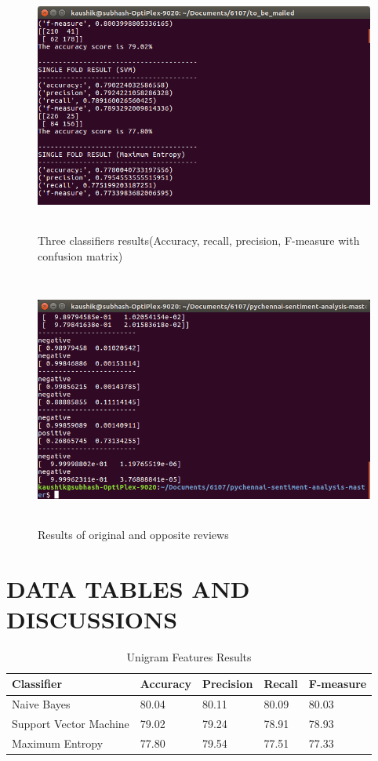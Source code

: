 \documentclass[oneside,a4paper,12pt]{pictreport}
\begin{document}
\begin{figure}[!h]
\includegraphics[width=5.5in,height=3.3in]{screenshot5.png}
\caption{Three classifiers results(Accuracy, recall, precision, F-measure with confusion matrix)}
\end{figure}


\begin{figure}[!h]
\includegraphics[width=5.5in,height=3.3in]{screenshot_1.png}
\caption{Results of original and opposite reviews}
\end{figure}


\chapter{DATA TABLES AND DISCUSSIONS} 


\begin{table}[h!]
\centering
\caption{Unigram Features Results}
\label{my-label}
\begin{tabular}{|l|l|l|l|l|}
\hline
\textbf{Classifier} & \textbf{Accuracy} & \textbf{Precision} & \textbf{Recall} & \textbf{F-measure}\\ \hline
Naive Bayes          & 80.04  & 80.11 & 80.09 & 80.03                   \\ \hline
Support Vector Machine          & 79.02  & 79.24 & 78.91 & 78.93                   \\ \hline
Maximum Entropy          & 77.80  & 79.54 & 77.51 & 77.33 \\ \hline
\end{tabular}
\end{table}
\end{document}
